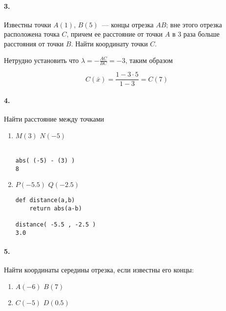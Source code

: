 
\paragraph{3.} Известны точки $A(1)$, $B(5)$\ --- концы отрезка $AB$; вне этого
отрезка расположена точка $C$, причем ее расстояние от точки $A$ в 3 раза больше
расстояния от точки $B$. Найти координату точки $C$.

Нетрудно установить что $\lambda = -\frac{AC}{BC} = -3$, таким образом

\begin{equation}
C(\bar x) = \frac{1-3 \cdot 5}{1-3} = C(7) 
\end{equation}


\paragraph{4.} Найти расстояние между точками

\begin{enumerate}
  \item $M(3)$ $N(-5)$
   
  \py\\\verb|abs( (-5) - (3) )|\\\verb|8|
  \item $P(-5.5)$ $Q(-2.5)$
  
  \py
  \begin{verbatim}
def distance(a,b)
    return abs(a-b)

distance( -5.5 , -2.5 )
3.0
\end{verbatim}
\end{enumerate}

\paragraph{5.} Найти координаты середины отрезка, если известны его
концы:
\begin{enumerate}
  \item $A(-6)$ $B(7)$
  \item $C(-5)$ $D(0.5)$
\end{enumerate}


\secup



\secup